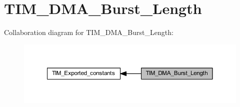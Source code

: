 \hypertarget{group___t_i_m___d_m_a___burst___length}{}\section{T\+I\+M\+\_\+\+D\+M\+A\+\_\+\+Burst\+\_\+\+Length}
\label{group___t_i_m___d_m_a___burst___length}
Collaboration diagram for T\+I\+M\+\_\+\+D\+M\+A\+\_\+\+Burst\+\_\+\+Length\+:\nopagebreak
\begin{figure}[H]
\begin{center}
\leavevmode
\includegraphics[width=350pt]{group___t_i_m___d_m_a___burst___length}
\end{center}
\end{figure}
